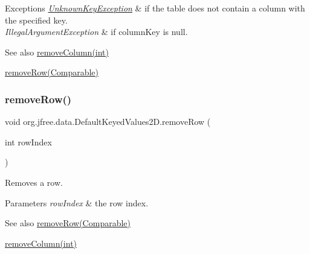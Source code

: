 \begin{DoxyExceptions}{Exceptions}
{\em \mbox{\hyperlink{classorg_1_1jfree_1_1data_1_1_unknown_key_exception}{Unknown\+Key\+Exception}}} & if the table does not contain a column with the specified key. \\
\hline
{\em Illegal\+Argument\+Exception} & if {\ttfamily column\+Key} is {\ttfamily null}.\\
\hline
\end{DoxyExceptions}
\begin{DoxySeeAlso}{See also}
\mbox{\hyperlink{classorg_1_1jfree_1_1data_1_1_default_keyed_values2_d_addf0f65958a134a32cccc78d7b2e4024}{remove\+Column(int)}} 

\mbox{\hyperlink{classorg_1_1jfree_1_1data_1_1_default_keyed_values2_d_a3e1bb0814720de431e1ee4704e58922d}{remove\+Row(\+Comparable)}} 
\end{DoxySeeAlso}
\mbox{\label{classorg_1_1jfree_1_1data_1_1_default_keyed_values2_d_ad0ba13bb6997d580f816f62297d7ef96}} 
\subsubsection{\texorpdfstring{remove\+Row()}{removeRow()}\hspace{0.1cm}{\footnotesize\ttfamily [1/2]}}
{\footnotesize\ttfamily void org.\+jfree.\+data.\+Default\+Keyed\+Values2\+D.\+remove\+Row (\begin{DoxyParamCaption}\item[{int}]{row\+Index }\end{DoxyParamCaption})}

Removes a row.


\begin{DoxyParams}{Parameters}
{\em row\+Index} & the row index.\\
\hline
\end{DoxyParams}
\begin{DoxySeeAlso}{See also}
\mbox{\hyperlink{classorg_1_1jfree_1_1data_1_1_default_keyed_values2_d_a3e1bb0814720de431e1ee4704e58922d}{remove\+Row(\+Comparable)}} 

\mbox{\hyperlink{classorg_1_1jfree_1_1data_1_1_default_keyed_values2_d_addf0f65958a134a32cccc78d7b2e4024}{remove\+Column(int)}} 
\end{DoxySeeAlso}
\mbox{\label{classorg_1_1jfree_1_1data_1_1_default_keyed_values2_d_a3e1bb0814720de431e1ee4704e58922d}} 
